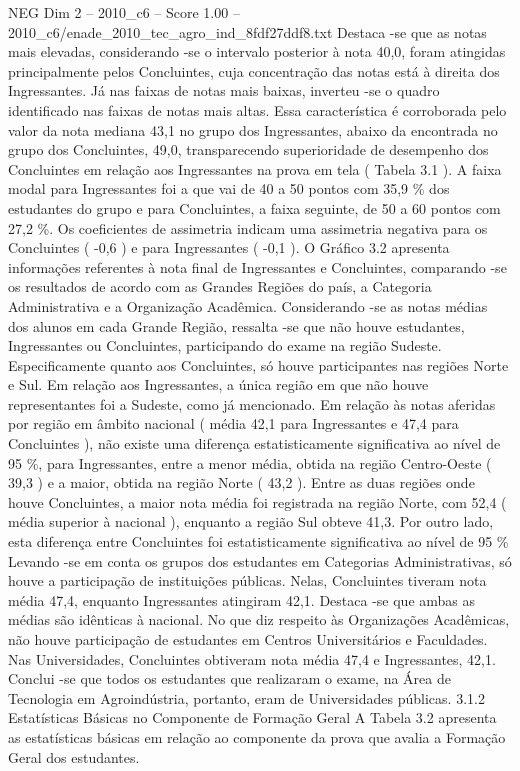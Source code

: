 \begin{textsample}{NEG Dim 2 – 2010\_c6 – Score 1.00 – 2010\_c6/enade\_2010\_tec\_agro\_ind\_8fdf27ddf8.txt}
Destaca -se que as notas mais elevadas, considerando -se o intervalo posterior à nota 40,0, foram atingidas principalmente pelos Concluintes, cuja concentração das notas está à direita dos Ingressantes.
Já nas faixas de notas mais baixas, inverteu -se o quadro identificado nas faixas de notas mais altas.
Essa característica é corroborada pelo valor da nota mediana 43,1 no grupo dos Ingressantes, abaixo da encontrada no grupo dos Concluintes, 49,0, transparecendo superioridade de desempenho dos Concluintes em relação aos Ingressantes na prova em tela ( Tabela 3.1 ).
A faixa modal para Ingressantes foi a que vai de 40 a 50 pontos com 35,9 \% dos estudantes do grupo e para Concluintes, a faixa seguinte, de 50 a 60 pontos com 27,2 \%.
Os coeficientes de assimetria indicam uma assimetria negativa para os Concluintes ( -0,6 ) e para Ingressantes ( -0,1 ).
O Gráfico 3.2 apresenta informações referentes à nota final de Ingressantes e Concluintes, comparando -se os resultados de acordo com as Grandes Regiões do país, a Categoria Administrativa e a Organização Acadêmica.
Considerando -se as notas médias dos alunos em cada Grande Região, ressalta -se que não houve estudantes, Ingressantes ou Concluintes, participando do exame na região Sudeste.
Especificamente quanto aos Concluintes, só houve participantes nas regiões Norte e Sul.
Em relação aos Ingressantes, a única região em que não houve representantes foi a Sudeste, como já mencionado.
Em relação às notas aferidas por região em âmbito nacional ( média 42,1 para Ingressantes e 47,4 para Concluintes ), não existe uma diferença estatisticamente significativa ao nível de 95 \%, para Ingressantes, entre a menor média, obtida na região Centro-Oeste ( 39,3 ) e a maior, obtida na região Norte ( 43,2 ).
Entre as duas regiões onde houve Concluintes, a maior nota média foi registrada na região Norte, com 52,4 ( média superior à nacional ), enquanto a região Sul obteve 41,3.
Por outro lado, esta diferença entre Concluintes foi estatisticamente significativa ao nível de 95 \% Levando -se em conta os grupos dos estudantes em Categorias Administrativas, só houve a participação de instituições públicas.
Nelas, Concluintes tiveram nota média 47,4, enquanto Ingressantes atingiram 42,1.
Destaca -se que ambas as médias são idênticas à nacional.
No que diz respeito às Organizações Acadêmicas, não houve participação de estudantes em Centros Universitários e Faculdades.
Nas Universidades, Concluintes obtiveram nota média 47,4 e Ingressantes, 42,1.
Conclui -se que todos os estudantes que realizaram o exame, na Área de Tecnologia em Agroindústria, portanto, eram de Universidades públicas. 3.1.2 Estatísticas Básicas no Componente de Formação Geral A Tabela 3.2 apresenta as estatísticas básicas em relação ao componente da prova que avalia a Formação Geral dos estudantes.

\end{textsample}
